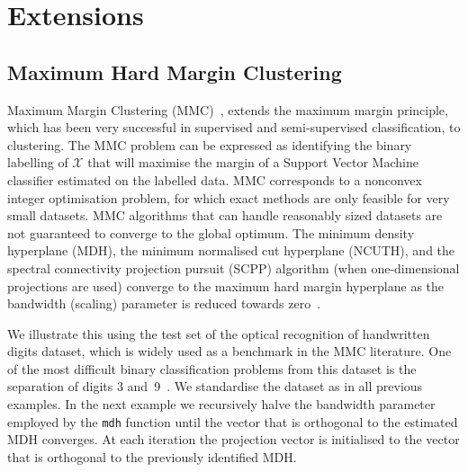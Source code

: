 \documentclass{book}
\begin{document}
\chapter{Extensions}


\section{Maximum Hard Margin Clustering}

Maximum Margin Clustering (MMC)~\cite{XuNLS2004}, extends the maximum margin
principle, which has been very successful in supervised and semi-supervised
classification, to clustering.
%
The MMC problem can be expressed as identifying the binary labelling of $\mathcal{X}$
that will maximise the margin of a Support Vector Machine classifier estimated
on the labelled data. MMC corresponds to a nonconvex integer optimisation
problem, for which
%
exact methods are only feasible for very small datasets.
%
MMC algorithms that can handle reasonably sized datasets are not guaranteed
to converge to the global optimum.
%
The minimum density hyperplane (MDH), the minimum normalised cut hyperplane
(NCUTH), and the spectral connectivity projection pursuit (SCPP) algorithm
(when one-dimensional projections are used)
converge to the maximum hard margin hyperplane as the bandwidth
(scaling) parameter is reduced towards zero~\cite{PavlidisHT2016,Hofmeyr2017,HofmeyrPE2018}. 
%
%


We illustrate this using the test set of the optical recognition of handwritten
digits dataset, which is widely used as a benchmark in the MMC literature.
%
One of the most difficult binary classification problems from this dataset is
the separation of digits 3 and~9~\cite[Table IV]{ZhangTK2009}.
%
We standardise the dataset as in all previous examples.
%
In the next example we recursively halve the bandwidth parameter
employed by the {\tt mdh} function until the vector that is orthogonal to the
estimated MDH converges. 
%
At each iteration the projection vector is initialised to the 
vector that is orthogonal to the previously
identified MDH. 
\end{document}
